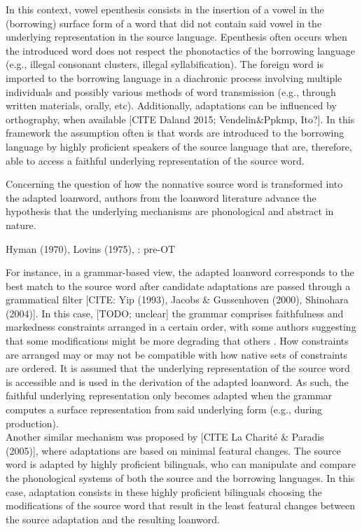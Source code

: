 In this context, vowel epenthesis consists in the insertion of a vowel in the (borrowing) surface form of a word that did not contain said vowel in the underlying representation in the source language. Epenthesis often occurs when the introduced word does not respect the phonotactics of the borrowing language (e.g., illegal consonant clusters, illegal syllabification).
The foreign word is imported to the borrowing language in a diachronic process involving multiple individuals and possibly various methods of word transmission (e.g., through written materials, orally, etc). Additionally, adaptations can be influenced by orthography, when available [CITE Daland 2015; Vendelin\&Ppkmp, Ito?]. In this framework the assumption often is that words are introduced to the borrowing language by highly proficient speakers of the source language that are, therefore, able to access a faithful underlying representation of the source word. 

Concerning the question of how the nonnative source word is transformed into the adapted loanword, authors from the loanword literature advance the hypothesis that the underlying mechanisms are phonological and abstract in nature.


{\color{red}Hyman (1970), Lovins (1975), : pre-OT}

For instance, in a grammar-based view, the adapted loanword corresponds to the best match to the source word after candidate adaptations are passed through a grammatical filter  [CITE: Yip (1993), Jacobs \& Gussenhoven (2000), Shinohara (2004)]. In this case, {\color{red}[TODO; unclear] the grammar comprises faithfulness and markedness constraints arranged in a certain order, with some authors suggesting that some modifications might be more degrading that others \cite{steriade2001}. How constraints are arranged may or may not be compatible with how native sets of constraints are ordered.} It is assumed that the underlying representation of the source word is accessible and is used in the derivation of the adapted loanword. As such, the faithful underlying representation only becomes adapted when the grammar computes a surface representation from said underlying form (e.g., during production).   \\

Another similar mechanism was proposed by [CITE La Charité \& Paradis (2005)], where adaptations are based on minimal featural changes. The source word is adapted by highly proficient bilinguals, who can manipulate and compare the phonological systems of both the source and the borrowing languages. In this case, adaptation consists in these highly proficient bilinguals choosing the modifications of the source word that result in the least featural changes between the source adaptation and the resulting loanword.  

